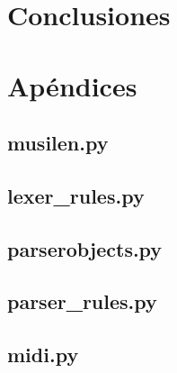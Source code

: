 \documentclass[a4paper, 10pt, twoside]{article}
\begin{document}
\section{Conclusiones}

\newpage

\section{Apéndices}

\subsection{musilen.py}

\newpage

\subsection{lexer\_rules.py}

\newpage

\subsection{parserobjects.py}

\newpage

\subsection{parser\_rules.py}

\newpage

\subsection{midi.py}

\end{document}
